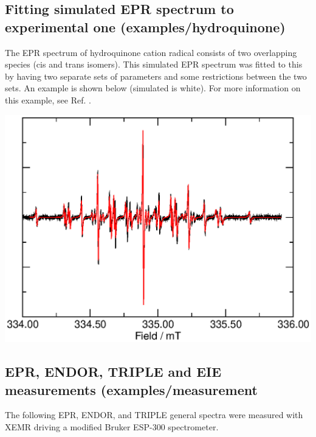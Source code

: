 \documentclass[byrevtex,amssymb,aps,pra,floatfix,letterpaper]{revtex4}
\begin{document}
\subsection{Fitting simulated EPR spectrum to experimental one (examples/hydroquinone)}

The EPR spectrum of hydroquinone cation radical consists of two overlapping species (cis and trans isomers). This simulated EPR spectrum was fitted to this by having two separate sets of parameters and some restrictions between the two sets. An example is shown below (simulated is white). For more information on this example, see Ref. \cite{eloranta}.

\begin{center}
\includegraphics*[scale=0.4]{fig8}
\end{center}

\subsection{EPR, ENDOR, TRIPLE and EIE measurements (examples/measurement}

The following EPR, ENDOR, and TRIPLE general spectra were measured with XEMR driving a modified Bruker ESP-300 spectrometer.
\end{document}
